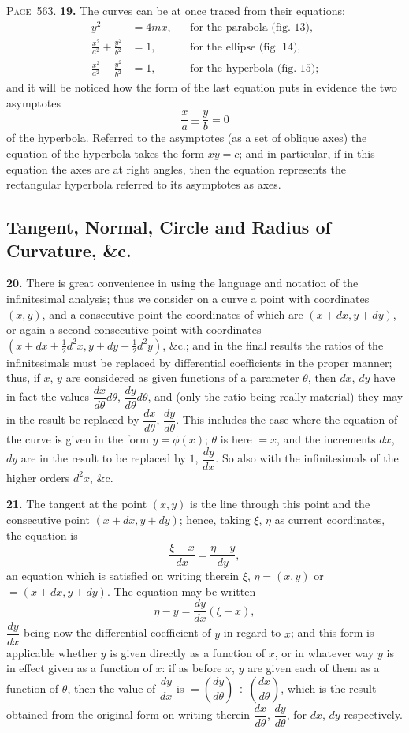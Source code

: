 \documentclass[11pt,a4paper]{article}
\theoremstyle{definition}
\begin{document}
\newpage
\noindent\textsc{Page~563.} \textbf{19.} The curves can be at once traced from their equations:
\begin{align*}
y^2 &= 4mx, && \text{for the parabola (fig.~13),}\\
\frac{x^2}{a^2}+\frac{y^2}{b^2} &= 1, && \text{for the ellipse (fig.~14),}\\
\frac{x^2}{a^2}-\frac{y^2}{b^2} &= 1, && \text{for the hyperbola (fig.~15);}
\end{align*}
and it will be noticed how the form of the last equation puts in evidence the two asymptotes
\[
\frac{x}{a}\pm\frac{y}{b}=0
\]
of the hyperbola. Referred to the asymptotes (as a set of oblique axes) the equation of the hyperbola takes the form $xy=c$; and in particular, if in this equation the axes are at right angles, then the equation represents the rectangular hyperbola referred to its asymptotes as axes.

\subsection*{Tangent, Normal, Circle and Radius of Curvature, \&c.}

\textbf{20.} There is great convenience in using the language and notation of the infinitesimal analysis; thus we consider on a curve a point with coordinates $(x,y)$, and a consecutive point the coordinates of which are $(x+dx, y+dy)$, or again a second consecutive point with coordinates $(x+dx+\tfrac12d^2x, y+dy+\tfrac12d^2y)$, \&c.; and in the final results the ratios of the infinitesimals must be replaced by differential coefficients in the proper manner; thus, if $x$, $y$ are considered as given functions of a parameter $\theta$, then $dx$, $dy$ have in fact the values $\dfrac{dx}{d\theta}d\theta$, $\dfrac{dy}{d\theta}d\theta$, and (only the ratio being really material) they may in the result be replaced by $\dfrac{dx}{d\theta}$, $\dfrac{dy}{d\theta}$. This includes the case where the equation of the curve is given in the form $y=\phi(x)$; $\theta$ is here $=x$, and the increments $dx$, $dy$ are in the result to be replaced by $1$, $\dfrac{dy}{dx}$. So also with the infinitesimals of the higher orders $d^2x$, \&c.

\textbf{21.} The tangent at the point $(x,y)$ is the line through this point and the consecutive point $(x+dx, y+dy)$; hence, taking $\xi$, $\eta$ as current coordinates, the equation is
\[
\frac{\xi-x}{dx}=\frac{\eta-y}{dy},
\]
an equation which is satisfied on writing therein $\xi$, $\eta=(x,y)$ or $=(x+dx, y+dy)$. The equation may be written
\[
\eta-y=\frac{dy}{dx}(\xi-x),
\]
$\dfrac{dy}{dx}$ being now the differential coefficient of $y$ in regard to $x$; and this form is applicable whether $y$ is given directly as a function of $x$, or in whatever way $y$ is in effect given as a function of $x$: if as before $x$, $y$ are given each of them as a function of $\theta$, then the value of $\dfrac{dy}{dx}$ is $=\left(\dfrac{dy}{d\theta}\right)\div\left(\dfrac{dx}{d\theta}\right)$, which is the result obtained from the original form on writing therein $\dfrac{dx}{d\theta}$, $\dfrac{dy}{d\theta}$, for $dx$, $dy$ respectively.
\end{document}
